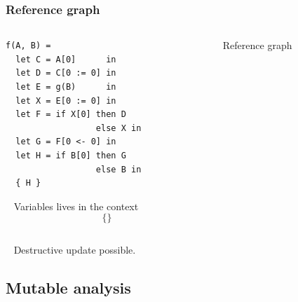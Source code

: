 \documentclass{beamer}
\newcommand{\cl}[1]{\texttt{#1}}
\begin{document}
\begin{frame}[fragile]
\frametitle{Reference graph}
\begin{columns}
\begin{column}{0.5\textwidth}
\begin{lstlisting}
f(A, B) =
  let C = A[0]      in
  let D = C[0 := 0] in
  let E = g(B)      in
  let X = E[0 := 0] in
  let F = if X[0] then D
                  else X in
  let G = F[0 <- 0] in
  let H = if B[0] then G
                  else B in
  { H }
\end{lstlisting}
\ \newline
Variables lives in the context
$$\{  \}$$
\end{column}
\begin{column}{0.5\textwidth}
Reference graph
\begin{center}
\end{center}
\end{column}
\end{columns}
\ \newline
Destructive update possible.
\end{frame}




\subsection{Mutable analysis}
\end{document}
